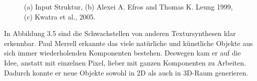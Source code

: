 \documentclass[12pt, a4paper,twoside,openright]{report} %
\begin{document}
\begin{figure}[H]
    \centering
    \qquad
    \qquad
    \caption{(a) Input Struktur, (b) Alexei A. Efros and Thomas K. Leung 1999, (c) Kwatra et al., 2005. \cite{merrell2009model}}%
\end{figure}

In Abbildung 3.5 sind die Schwachstellen von anderen Textursynthesen klar erkennbar.
\newline
Paul Merrell erkannte das viele natürliche und künstliche Objekte aus sich immer wiederholenden Komponenten bestehen.
Deswegen kam er auf die Idee, anstatt mit einzelnen Pixel, lieber mit ganzen Komponenten zu Arbeiten.
Dadurch konnte er neue Objekte sowohl in 2D als auch in 3D-Raum generieren.
\end{document}
